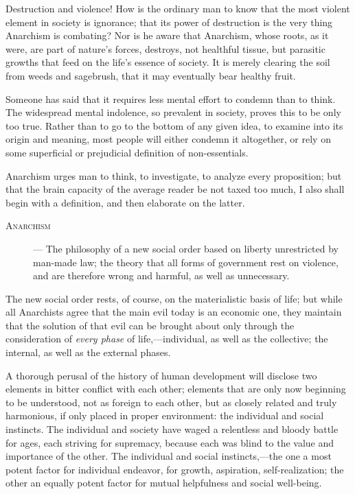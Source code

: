 Destruction and violence! How is the ordinary man to know that the
most violent element in society  is ignorance; that its power
of destruction is the very thing Anarchism is combating? Nor is he
aware that Anarchism, whose roots, as it were, are part of nature's
forces, destroys, not healthful tissue, but parasitic growths that
feed on the life's essence of society. It is merely clearing the soil
from weeds and sagebrush, that it may eventually bear healthy fruit.

Someone has said that it requires less mental effort to condemn than
to think. The widespread mental indolence, so prevalent in society,
proves this to be only too true. Rather than to go to the bottom of
any given idea, to examine into its origin and meaning, most people
will either condemn it altogether, or rely on some superficial or
prejudicial definition of non-essentials.

Anarchism urges man to think, to investigate, to analyze every
proposition; but that the brain capacity of the average reader be not
taxed too much, I also shall begin with a definition, and then
elaborate on the latter.

\begin{description}

\item[\textsc{Anarchism}]--- The philosophy of a new social order
based on liberty unrestricted by man-made law; the theory that all
forms of government rest on violence, and are therefore wrong and
harmful, as well as unnecessary.

\end{description}

The new social order rests, of course, on the materialistic basis of
life; but while all Anarchists agree that the main evil today is an
economic one, they maintain that the solution of that evil can be
brought about only through the consideration of \textit{every phase}
of life,---in\-di\-vid\-u\-al, as well as the collective; the
internal, as well as the external phases.

A thorough perusal of the history of human development will
disclose two elements in bitter conflict with each other; elements
that are only now beginning to be understood, not as foreign to each
other, but as closely related and truly harmonious, if only placed in
proper environment: the individual and social instincts. The
individual and society have waged a relentless and bloody battle for
ages, each striving for supremacy, because each was blind to the value
and importance of the other. The individual and social
instincts,---the one a most potent factor for individual endeavor, for
growth, aspiration, self-realization; the other an equally potent
factor for mutual helpfulness and social well-being.

